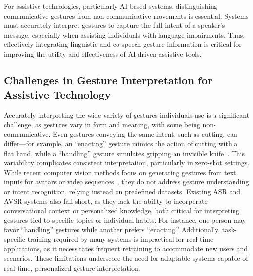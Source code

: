 For assistive technologies, particularly AI-based systems, distinguishing communicative gestures from non-communicative movements is essential. Systems must accurately interpret gestures to capture the full intent of a speaker’s message, especially when assisting individuals with language impairments. Thus, effectively integrating linguistic and co-speech gesture information is critical for improving the utility and effectiveness of AI-driven assistive tools.


\subsection{Challenges in Gesture Interpretation for Assistive Technology}
Accurately interpreting the wide variety of gestures individuals use is a significant challenge, as gestures vary in form and meaning, with some being non-communicative. Even gestures conveying the same intent, such as cutting, can differ—for example, an “enacting” gesture mimics the action of cutting with a flat hand, while a “handling” gesture simulates gripping an invisible knife~\cite{poggi2008iconicity,hassemer2018decoding}. This variability complicates consistent interpretation, particularly in zero-shot settings. While recent computer vision methods focus on generating gestures from text inputs for avatars or video sequences~\cite{ginosar2019learning,ahuja2022low,liu2022beat}, they do not address gesture understanding or intent recognition, relying instead on predefined datasets. Existing ASR and AVSR systems also fall short, as they lack the ability to incorporate conversational context or personalized knowledge, both critical for interpreting gestures tied to specific topics or individual habits. For instance, one person may favor “handling” gestures while another prefers “enacting.” Additionally, task-specific training required by many systems is impractical for real-time applications, as it necessitates frequent retraining to accommodate new users and scenarios. These limitations underscore the need for adaptable systems capable of real-time, personalized gesture interpretation.

